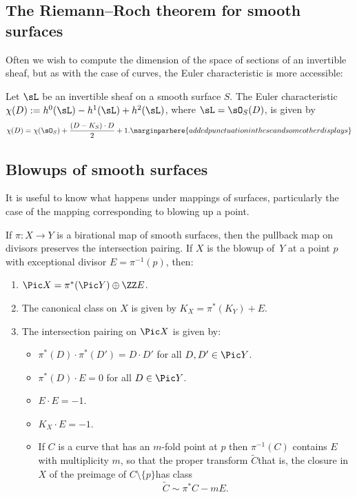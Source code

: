 \subsection*{The Riemann--Roch theorem for smooth surfaces}
Often we wish to compute the dimension of the space of sections of an invertible sheaf, but
as with the case of curves, the Euler characteristic is more accessible:

\begin{theorem} Let $\sL$ be an invertible sheaf on a smooth surface $S$.
%
%
The Euler characteristic $\chi(D) := h^0(\sL)-h^1(\sL)+h^2(\sL)$, where $\sL = \sO_S(D)$, is given by
$$
\chi(D) = \chi(\sO_S) + \frac{(D-K_S)\cdot D}{2}+1
.
\marginparhere{added punctuation in these and some other displays}
$$
\end{theorem}

\subsection*{Blowups of smooth surfaces}

It is useful to know what happens under mappings of surfaces, particularly the case of the mapping
corresponding to blowing up a point.

\begin{theorem}\label{divisor classes on blowup}
If $\pi: X \to Y$ is a birational map of smooth surfaces, then the pullback map on divisors
preserves the intersection pairing. If $X$ is the blowup of~$Y$ at a point $p$ with exceptional
divisor $E = \pi^{-1}(p)$, then:

\begin{enumerate}
 \item $\Pic X =\pi^*(\Pic Y) \oplus \ZZ E$.
\item The canonical class on $X$ is given by $K_X = \pi^*(K_Y)+E$.
 \item The intersection pairing on $\Pic X$ is given by:
 
\begin{itemize}
\item $\pi^*(D)\cdot\pi^*(D') = D\cdot D'$ for all $D,D'\in \Pic Y$.
\item $\pi^*(D)\cdot E = 0$ for all $D\in \Pic Y$.
 \item $E\cdot E = -1$.
 \item $K_X\cdot E = -1$.
 \item If $C$ is a curve that has an $m$-fold point at $p$ then
   $\pi^{-1}(C)$ contains $E$ with multiplicity $m$, so that the 
proper transform
 $\tilde C$\emdash that is, the closure in $X$ of the preimage of $C \setminus \{p\}$\emdash has class
 $$
 \tilde C \sim \pi^*C - mE.
 $$
 \end{itemize}
\end{enumerate}
\end{theorem}


